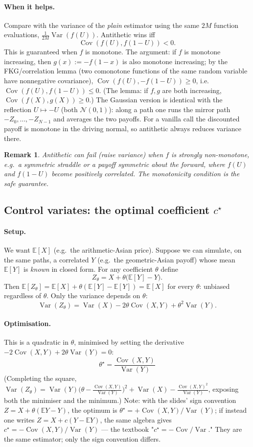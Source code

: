 \documentclass[11pt]{article}
\newcommand{\E}{\mathbb{E}}
\newcommand{\Var}{\operatorname{Var}}
\newcommand{\Cov}{\operatorname{Cov}}
\newtheorem{remark}{Remark}
\begin{document}
\paragraph{When it helps.} Compare with the variance of the \emph{plain} estimator
using the same $2M$ function evaluations, $\frac{1}{2M}\Var(f(U))$. Antithetic wins iff
\[
\Cov(f(U),f(1-U))<0.
\]
This is guaranteed when $f$ is monotone. The argument: if $f$ is monotone increasing,
then $g(x):=-f(1-x)$ is also monotone increasing; by the FKG/correlation lemma (two
comonotone functions of the same random variable have nonnegative covariance),
$\Cov(f(U),-f(1-U))\ge0$, i.e.\ $\Cov(f(U),f(1-U))\le0$. (The lemma: if $f,g$ are both
increasing, $\Cov(f(X),g(X))\ge0$.) The Gaussian version is identical with the
reflection $U\mapsto-U$ (both $\mathcal N(0,1)$): along a path one runs the mirror path
$-Z_0,\dots,-Z_{N-1}$ and averages the two payoffs. For a vanilla call the discounted
payoff is monotone in the driving normal, so antithetic always reduces variance there.

\begin{remark}
Antithetic can \emph{fail} (raise variance) when $f$ is strongly non-monotone, e.g.\ a
symmetric straddle or a payoff symmetric about the forward, where $f(U)$ and $f(1-U)$
become positively correlated. The monotonicity condition is the safe guarantee.
\end{remark}

\subsection{Control variates: the optimal coefficient $c^\star$}

\paragraph{Setup.} We want $\E[X]$ (e.g.\ the arithmetic-Asian price). Suppose we can
simulate, on the same paths, a correlated $Y$ (e.g.\ the geometric-Asian payoff) whose
mean $\E[Y]$ is \emph{known} in closed form. For any coefficient $\theta$ define
\[
Z_\theta=X+\theta\bigl(\E[Y]-Y\bigr).
\]
Then $\E[Z_\theta]=\E[X]+\theta(\E[Y]-\E[Y])=\E[X]$ for every $\theta$: unbiased
regardless of $\theta$. Only the variance depends on $\theta$:
\[
\Var(Z_\theta)=\Var(X)-2\theta\Cov(X,Y)+\theta^2\Var(Y).
\]

\paragraph{Optimisation.} This is a quadratic in $\theta$, minimised by setting the
derivative $-2\Cov(X,Y)+2\theta\Var(Y)=0$:
\[
\boxed{\;\theta^\star=\frac{\Cov(X,Y)}{\Var(Y)}\;}
\]
(Completing the square,
$\Var(Z_\theta)=\Var(Y)\bigl(\theta-\tfrac{\Cov(X,Y)}{\Var(Y)}\bigr)^2
+\Var(X)-\tfrac{\Cov(X,Y)^2}{\Var(Y)}$, exposing both the minimiser and the minimum.)
Note: with the slides' sign convention $Z=X+\theta(\E Y-Y)$, the optimum is
$\theta^\star=+\Cov(X,Y)/\Var(Y)$; if instead one writes $Z=X+c(Y-\E Y)$, the same
algebra gives $c^\star=-\Cov(X,Y)/\Var(Y)$ --- the textbook "$c^\star=-\Cov/\Var$." They
are the same estimator; only the sign convention differs.
\end{document}
